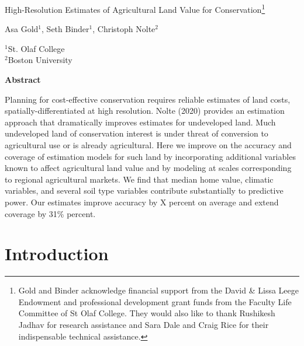 \documentclass[12pt]{article}
\begin{document}
\hspace{5pt}

\Large
 \begin{center}
High-Resolution Estimates of Agricultural Land Value for Conservation\footnote[2]{Gold and Binder acknowledge financial support from the David \& Lissa Leege Endowment and professional development grant funds from the Faculty Life Committee of St Olaf College. They would also like to thank Rushikesh Jadhav for research assistance and Sara Dale and Craig Rice for their indispensable technical assistance.}\\ 

\vspace{10pt}

\large
Asa Gold$^1$, Seth Binder$^1$, Christoph Nolte$^2$ \\

\vspace{10pt}

\footnotesize  
$^{1}$St. Olaf College\\
$^2$Boston University

\vspace{40pt} 

    \normalsize
    \textbf{Abstract}
\end{center}

\small
Planning for cost-effective conservation requires reliable estimates of land costs, spatially-differentiated at high resolution. Nolte (2020) provides an estimation approach that dramatically improves estimates for undeveloped land. Much undeveloped land of conservation interest is under threat of conversion to agricultural use or is already agricultural. Here we improve on the accuracy and coverage of estimation models for such land by incorporating additional variables known to affect agricultural land value and by modeling at scales corresponding to regional agricultural markets. We find that median home value, climatic variables, and several soil type variables contribute substantially to predictive power. Our estimates improve accuracy by X percent on average and extend coverage by 31\% percent. %

\newpage

\section{Introduction}
\end{document}
